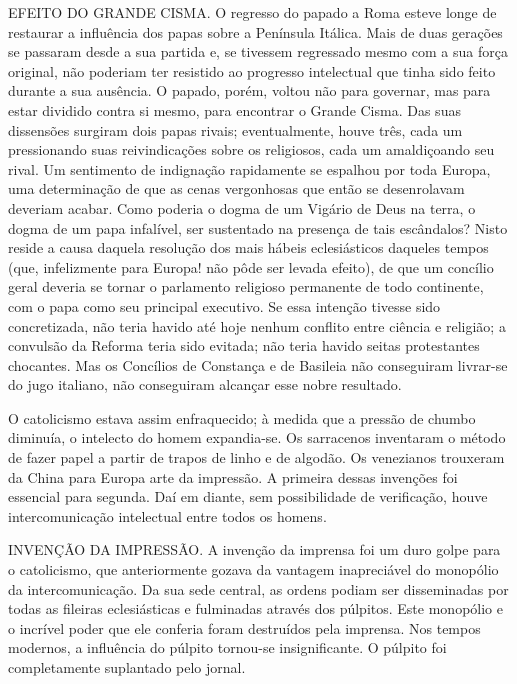 \documentclass[11pt,a5paper,twoside,openany]{book}
\begin{document}
EFEITO DO GRANDE CISMA. O regresso do papado a Roma esteve longe de restaurar a influência dos papas sobre a Península Itálica. Mais de duas gerações se passaram desde a sua partida e, se tivessem regressado mesmo com a sua força original, não poderiam ter resistido ao progresso intelectual que tinha sido feito durante a sua ausência. O papado, porém, voltou não para governar, mas para estar dividido contra si mesmo, para encontrar o Grande Cisma. Das suas dissensões surgiram dois papas rivais; eventualmente, houve três, cada um pressionando suas reivindicações sobre os religiosos, cada um amaldiçoando seu rival. Um sentimento de indignação rapidamente se espalhou por toda Europa, uma determinação de que as cenas vergonhosas que então se desenrolavam deveriam acabar. Como poderia o dogma de um Vigário de Deus na terra, o dogma de um papa infalível, ser sustentado na presença de tais escândalos? Nisto reside a causa daquela resolução dos mais hábeis eclesiásticos daqueles tempos (que, infelizmente para Europa! não pôde ser levada efeito), de que um concílio geral deveria se tornar o parlamento religioso permanente de todo continente, com o papa como seu principal executivo. Se essa intenção tivesse sido concretizada, não teria havido até hoje nenhum conflito entre ciência e religião; a convulsão da Reforma teria sido evitada; não teria havido seitas protestantes chocantes. Mas os Concílios de Constança e de Basileia não conseguiram livrar-se do jugo italiano, não conseguiram alcançar esse nobre resultado.

O catolicismo estava assim enfraquecido; à medida que a pressão de chumbo diminuía, o intelecto do homem expandia-se. Os sarracenos inventaram o método de fazer papel a partir de trapos de linho e de algodão. Os venezianos trouxeram da China para Europa arte da impressão. A primeira dessas invenções foi essencial para segunda. Daí em diante, sem possibilidade de verificação, houve intercomunicação intelectual entre todos os homens.

INVENÇÃO DA IMPRESSÃO. A invenção da imprensa foi um duro golpe para o catolicismo, que anteriormente gozava da vantagem inapreciável do monopólio da intercomunicação. Da sua sede central, as ordens podiam ser disseminadas por todas as fileiras eclesiásticas e fulminadas através dos púlpitos. Este monopólio e o incrível poder que ele conferia foram destruídos pela imprensa. Nos tempos modernos, a influência do púlpito tornou-se insignificante. O púlpito foi completamente suplantado pelo jornal.
\end{document}
